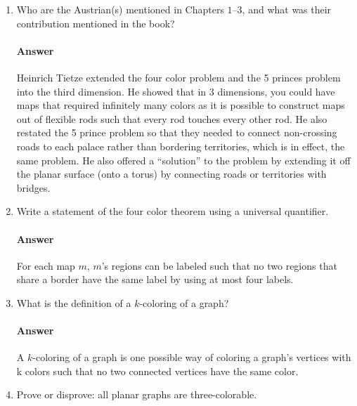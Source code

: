 \documentclass{article}
\begin{document}
\begin{enumerate}

    \item Who are the Austrian(s) mentioned in Chapters $1$--$3$, and what was their
        contribution mentioned in the book?

        \paragraph{Answer}
        Heinrich Tietze extended the four color problem and the 
        5 princes problem into the third dimension. He showed that in 3 dimensions, you 
        could have maps that required infinitely many colors as it is possible to construct 
        maps out of flexible rods such that every rod touches every other rod. He also restated
        the 5 prince problem so that they needed to connect non-crossing roads to each palace
        rather than bordering territories, which is in effect, the same problem. He also offered a
        ``solution'' to the problem by extending it off the planar surface (onto a torus) by 
        connecting roads or territories with bridges.

    \item Write a statement of the four color theorem using a universal
        quantifier.

        \paragraph{Answer}
        For each map $m$, $m$'s regions can be labeled such that no two regions that share a border have the same label by using at most four labels.

    \item What is the definition of a $k$-coloring of a graph?

        \paragraph{Answer}
        A $k$-coloring of a graph is one possible way of coloring a graph's vertices with k colors such that no two connected vertices have the same color.

    \item Prove or disprove: all planar graphs are three-colorable.


\end{enumerate}
\end{document}
